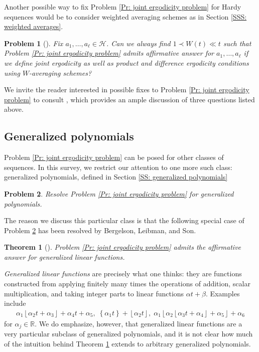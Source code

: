 \documentclass[11pt]{amsart}
\newtheorem{theorem}[lemma]{Theorem}
\newtheorem{problem}{Problem}
\theoremstyle{definition}
\newcommand{\R}{{\mathbb R}}
\newcommand{\CH}{{\mathcal H}}
\newcommand{\1}{{\mathbf{1}}}
\newcommand{\floor}[1]{{\left \lfloor #1 \right \rfloor}}
\newcommand{\rem}[1]{\left \{ #1 \right \}}
\begin{document}
Another possible way to fix Problem \ref{Pr: joint ergodicity problem} for Hardy sequences would be to consider weighted averaging schemes as in Section \ref{SSS: weighted averages}. 
\begin{problem}[{\cite[Conjecture 8.8]{DKKST25}}]
    Fix $a_1, \ldots, a_\ell\in\CH$. Can we always find $1 \prec W(t) \ll t$ such that Problem \ref{Pr: joint ergodicity problem} admits affirmative answer for $a_1, \ldots, a_\ell$ if we define joint ergodicity as well as product and difference ergodicity conditions using $W$-averaging schemes?
\end{problem}
We invite the reader interested in possible fixes to Problem \ref{Pr: joint ergodicity problem} to consult \cite[Section 8]{DKKST25}, which provides an ample discussion of three questions listed above. 

\subsection{Generalized polynomials}
Problem \ref{Pr: joint ergodicity problem} can be posed for other classes of sequences. In this survey, we restrict our attention to one more such class: generalized polynomials, defined in Section \ref{SS: generalized polynomials}
\begin{problem}\label{Pr: joint ergodicity problem for generalized polys}
    Resolve Problem \ref{Pr: joint ergodicity problem} for generalized polynomials. 
\end{problem}

The reason we discuss this particular class is that the following special case of Problem \ref{Pr: joint ergodicity problem for generalized polys} has been resolved by Bergelson, Leibman, and Son. %
\begin{theorem}[{\cite[Theorem 0.4]{BLS16}}]\label{T: BLS generalized linear}
    Problem \ref{Pr: joint ergodicity problem} admits the affirmative answer for generalized linear functions. 
\end{theorem}
\emph{Generalized linear functions} are precisely what one thinks: they are functions constructed from applying finitely many times the operations of addition, scalar multiplication, and taking integer parts to linear functions $\alpha t + \beta$. Examples include
\begin{align*}
    \alpha_1\floor{\alpha_2 t + \alpha_3} + \alpha_4 t + \alpha_5,\; \rem{\alpha_1 t} + \floor{\alpha_2 t}, \; \alpha_1\floor{\alpha_2\floor{\alpha_3 t + \alpha_4}+\alpha_5}+\alpha_6
\end{align*}
for $\alpha_j\in\R$. We do emphasize, however, that generalized linear functions are a very particular subclass of generalized polynomials, and it is not clear how much of the intuition behind Theorem \ref{T: BLS generalized linear} extends to arbitrary generalized polynomials. 
\end{document}
